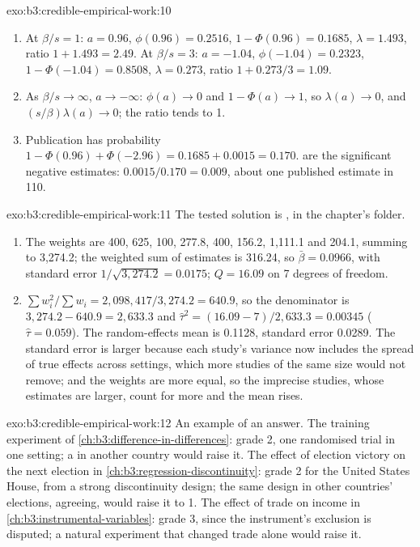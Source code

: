 \begin{solution}{exo:b3:credible-empirical-work:10}
\begin{enumerate}
\item At $\beta/s = 1$: $a = 0.96$, $\phi(0.96) = 0.2516$, $1 - \Phi(0.96) = 0.1685$,
$\lambda = 1.493$, ratio $1 + 1.493 = 2.49$. At $\beta/s = 3$: $a = -1.04$,
$\phi(-1.04) = 0.2323$, $1 - \Phi(-1.04) = 0.8508$, $\lambda = 0.273$, ratio $1 +
0.273/3 = 1.09$.
\item As $\beta/s \to \infty$, $a \to -\infty$: $\phi(a) \to 0$ and $1 - \Phi(a) \to 1$,
so $\lambda(a) \to 0$, and $(s/\beta)\lambda(a) \to 0$; the ratio tends to 1.
\item Publication has probability $1 - \Phi(0.96) + \Phi(-2.96) = 0.1685 + 0.0015 =
0.170$.  are the significant negative estimates: $0.0015/0.170 =
0.009$, about one published estimate in 110.
\end{enumerate}
\end{solution}

\begin{solution}{exo:b3:credible-empirical-work:11}
The tested solution is , in the chapter's
 folder.
\begin{enumerate}
\item The weights are 400, 625, 100, 277.8, 400, 156.2, 1{,}111.1 and 204.1,
summing to 3{,}274.2; the weighted sum of estimates is 316.24, so $\bar\beta =
0.0966$, with standard error $1/\sqrt{3{,}274.2} = 0.0175$; $Q = 16.09$ on 7 degrees
of freedom. %
\item $\sum w_i^2/\sum w_i = 2{,}098{,}417/3{,}274.2 = 640.9$, so the denominator is
$3{,}274.2 - 640.9 = 2{,}633.3$ and $\hat\tau^2 = (16.09 - 7)/2{,}633.3 = 0.00345$
($\hat\tau = 0.059$). The random-effects mean is 0.1128, standard error 0.0289. The
standard error is larger because each study's variance now includes the
spread of true effects across settings, which more studies of the same size
would not remove; and the weights are more equal, so the imprecise studies,
whose estimates are larger, count for more and the mean rises.
\end{enumerate}
\end{solution}

\begin{solution}{exo:b3:credible-empirical-work:12}
An example of an answer. The training experiment of
\cref{ch:b3:difference-in-differences}: grade 2, one randomised trial in one
setting; a  in another country would raise it. The effect of
election victory on the next election in \cref{ch:b3:regression-discontinuity}:
grade 2 for the United States House, from a strong discontinuity design; the
same design in other countries' elections, agreeing, would raise it to 1. The
effect of trade on income in \cref{ch:b3:instrumental-variables}: grade 3, since
the instrument's exclusion is disputed; a natural experiment that changed trade
alone would raise it.
\end{solution}

